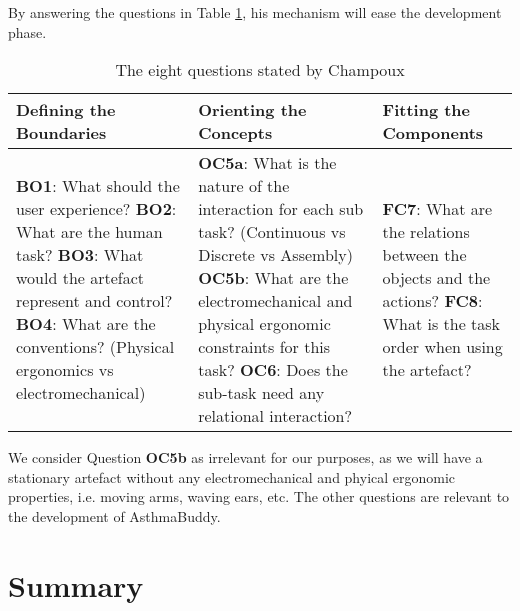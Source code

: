 By answering the questions in Table \ref{tab:tuidesign}, his mechanism will ease the development phase.   


\begin{table}[h]
	\begin{tabular}{| p{5.0cm} | p{5.0cm} | p{5.0cm} |}
	\hline
	\textbf{Defining the Boundaries} & \textbf{Orienting the Concepts} & \textbf{Fitting the Components} \\
	\hline
	\textbf{BO1}: What should the user experience? \newline
	\textbf{BO2}: What are the human task? \newline
	\textbf{BO3}: What would the artefact represent and control? \newline 
	\textbf{BO4}: What are the conventions? (Physical ergonomics vs electromechanical) \newline 
	&
	\textbf{OC5a}: What is the nature of the interaction for each sub task? (Continuous vs Discrete vs Assembly) \newline
	\textbf{OC5b}: What are the electromechanical and physical ergonomic constraints for this task? \newline
	\textbf{OC6}: Does the sub-task need any relational interaction? \newline
	&
	\textbf{FC7}: What are the relations between the objects and the actions? \newline 
	\textbf{FC8}: What is the task order when using the artefact? \\ 
	\hline
	
	\end{tabular}
	\caption{The eight questions stated by Champoux\cite{subramaniandesign}}
	\label{tab:tuidesign}
\end{table}  

We consider Question \textbf{OC5b} as irrelevant for our purposes, as we will have a stationary artefact without any electromechanical and phyical ergonomic properties, i.e. moving arms, waving ears, etc. The other questions are relevant to the development of AsthmaBuddy.

\newpage





\section{Summary}


